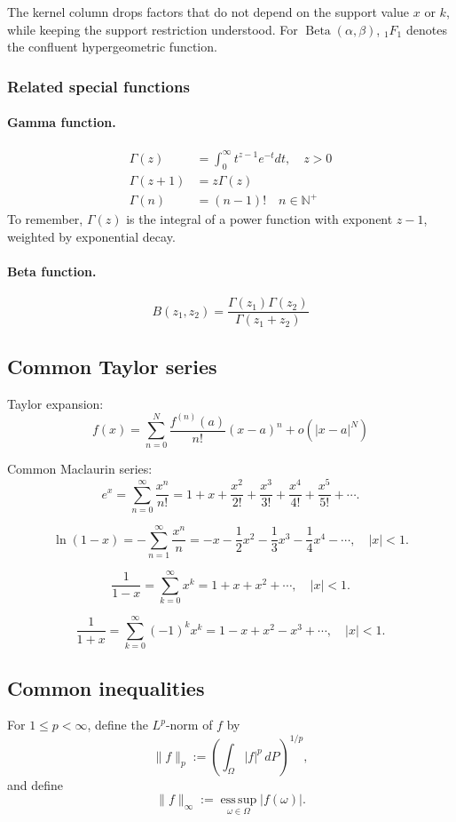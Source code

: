 \documentclass{article}
\theoremstyle{break}
\newcommand{\N}{\ensuremath{\mathbb{N}}}
\begin{document}
The kernel column drops factors that do not depend on the support value \(x\) or \(k\), while keeping the support restriction understood. 
For \(\operatorname{Beta}(\alpha,\beta)\), \({}_1F_1\) denotes the confluent hypergeometric function.
\endgroup


\subsubsection{Related special functions}
\paragraph{Gamma function.}
\begin{align*}
    \Gamma(z) &= \int_0^\infty t^{z-1} e^{-t} dt,\quad z>0\\
    \Gamma(z+1) &= z \Gamma(z)\\
    \Gamma(n) &= (n-1)! \quad n \in \N^+
\end{align*}
To remember, $\Gamma(z)$ is the integral of a power function with exponent $z-1$, weighted by exponential decay.

\paragraph{Beta function.}
\[
B(z_1, z_2) = \frac{\Gamma(z_1)\Gamma(z_2)}{\Gamma(z_1 + z_2)}
\]



\subsection{Common Taylor series}\label{sec:misc-common-series}

Taylor expansion:
\[
f(x) = \sum_{n=0}^N \frac{f^{(n)}(a)}{n!} (x-a)^n + o(|x-a|^{N})
\]

Common Maclaurin series:
\[
e^x = \sum_{n=0}^{\infty} \frac{x^n}{n!} 
= 1 + x + \frac{x^2}{2!} + \frac{x^3}{3!} + \frac{x^4}{4!} + \frac{x^5}{5!} + \cdots.
\]

\[
\ln(1-x) = - \sum_{n=1}^\infty \frac{x^n}{n} = -x - \frac{1}{2}x^2 - \frac{1}{3}x^3 - \frac{1}{4}x^4 - \cdots, \quad |x| < 1.
\]

\[
\frac{1}{1-x} = \sum_{k=0}^\infty x^k = 1 + x + x^2 + \cdots, \quad |x|<1.
\]

\[
\frac{1}{1+x} = \sum_{k=0}^\infty (-1)^k x^k = 1 - x + x^2 - x^3 + \cdots, \quad |x|<1.
\]


\subsection{Common inequalities}\label{sec:misc-common-inequalities}
For $1 \leq p < \infty$, define the $L^p$-norm of $f$ by
\[
    \|f\|_p := \left(\int_\Omega |f|^p\,dP\right)^{1/p},
\]
and define
\[
    \|f\|_\infty
    := \operatorname*{ess\,sup}_{\omega\in\Omega}|f(\omega)|.
\]
\end{document}
